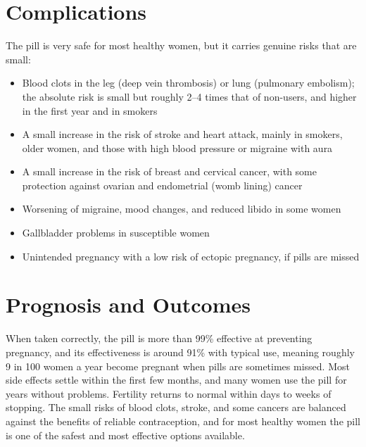 \section*{Complications}
The pill is very safe for most healthy women, but it carries genuine risks that are small:

\begin{itemize}
    \item Blood clots in the leg (deep vein thrombosis) or lung (pulmonary embolism); the absolute risk is small but roughly 2--4 times that of non-users, and higher in the first year and in smokers
    \item A small increase in the risk of stroke and heart attack, mainly in smokers, older women, and those with high blood pressure or migraine with aura
    \item A small increase in the risk of breast and cervical cancer, with some protection against ovarian and endometrial (womb lining) cancer
    \item Worsening of migraine, mood changes, and reduced libido in some women
    \item Gallbladder problems in susceptible women
    \item Unintended pregnancy with a low risk of ectopic pregnancy, if pills are missed
\end{itemize}

\section*{Prognosis and Outcomes}
When taken correctly, the pill is more than 99\% effective at preventing pregnancy, and its effectiveness is around 91\% with typical use, meaning roughly 9 in 100 women a year become pregnant when pills are sometimes missed. Most side effects settle within the first few months, and many women use the pill for years without problems. Fertility returns to normal within days to weeks of stopping. The small risks of blood clots, stroke, and some cancers are balanced against the benefits of reliable contraception, and for most healthy women the pill is one of the safest and most effective options available.

